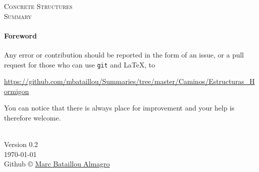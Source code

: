 \documentclass[landscape]{article}
\newcommand{\version}{0.2}
\begin{document}
\thispagestyle{empty}
\begin{center}
  \vspace*{\fill}
  \textsc{\Huge Concrete Structures\\[2ex] \huge Summary}
  \vfill
    \footnotesize{\paragraph{Foreword}
        Any error or contribution should be reported
        in the form of an issue, or a pull request for those
        who can use \texttt{git} and \LaTeX, to
        \begin{center}
          \url{https://github.com/mbataillou/Summaries/tree/master/Caminos/Estructuras_Hormigon}
        \end{center}
        You can notice that there is always place for improvement
        and your help is therefore welcome.
        \vspace{\baselineskip}}\\
  \footnotesize{
    Version \version\\[1ex]
    \today\\[1ex]
    Github \copyright{}
    \href{https://github.com/mbataillou?tab=repositories}{Marc Bataillou Almagro}\\
  }
\end{center}
\newpage

\thispagestyle{empty}
\begin{multicols*}{3}
  \tableofcontents
\end{multicols*}
\newpage
\end{document}

